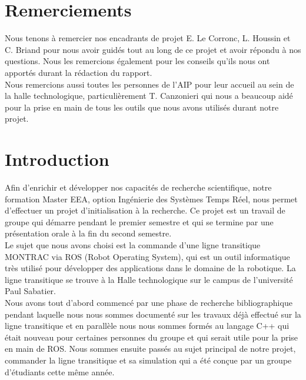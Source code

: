 \documentclass[a4paper,french, titlepage]{book}
\begin{document}
\newpage
{}
\chapter*{Remerciements}

Nous tenons à remercier nos encadrants de projet E. Le Corronc, L. Houssin et C. Briand pour nous avoir guidés tout au long de ce projet et avoir répondu à nos questions. Nous les remercions également pour les conseils qu'ils nous ont apportés durant la rédaction du rapport.\\

Nous remercions aussi toutes les personnes de l'AIP pour leur accueil au sein de la halle technologique, particulièrement T. Canzonieri qui nous a beaucoup aidé pour la prise en main de tous les outils que nous avons utilisés durant notre projet.

\newpage
\renewcommand{\contentsname}{Sommaire} %
\tableofcontents %


\newpage
{}
\chapter*{Introduction}


Afin d'enrichir et développer nos capacités de recherche scientifique, notre formation Master EEA, option Ingénierie des Systèmes Temps Réel, nous permet d'effectuer un projet d'initialisation à la recherche. Ce projet est un travail de groupe qui démarre pendant le premier semestre et qui se termine par une présentation orale à la fin du second semestre.\\

Le sujet que nous avons choisi est la commande d'une ligne transitique MONTRAC via ROS (Robot Operating System), qui est un outil informatique très utilisé pour développer des applications dans le domaine de la robotique. La ligne transitique se trouve à la Halle technologique sur le campus de l'université Paul Sabatier.\\

Nous avons tout d'abord commencé par une phase de recherche bibliographique pendant laquelle nous nous sommes documenté sur les travaux déjà effectué sur la ligne transitique et en parallèle nous nous sommes formés au langage C++ qui était nouveau pour certaines personnes du groupe et qui serait utile pour la prise en main de ROS. Nous sommes ensuite passés au sujet principal de notre projet, commander la ligne transitique et sa simulation qui a été conçue par un groupe d'étudiants cette même année.\\
\end{document}

